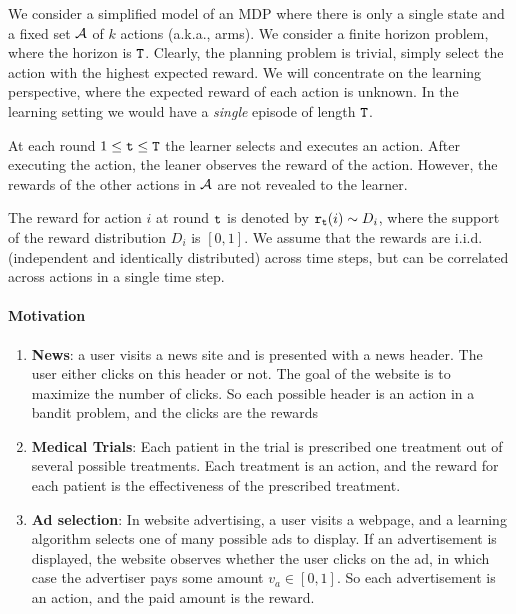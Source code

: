 


We consider a simplified model of an MDP where there is only a
single state and a fixed set $\mathcal{A}$ of $k$ actions (a.k.a., arms). We consider a finite horizon problem, where the horizon is ${\tt T}$.
Clearly, the planning problem is trivial, simply select the action
with the highest expected reward. We will concentrate on the
learning perspective, where the expected reward of each action is
unknown. In the learning setting we would have a \emph{single} episode of length ${\tt T}$.

At each round $1\leq {\tt t}\leq {\tt T}$ the learner selects and executes an action. After executing the action, the leaner observes the reward of the action. However, the rewards of the other actions in $\mathcal{A}$ are not revealed to the learner.

The reward for action $i$ at round ${\tt t}$ is denoted by ${\tt r}_{{\tt t}}(i)\sim D_{i}$, where the support of the reward distribution $D_{i}$ is $[0,1]$. We assume that the rewards are i.i.d. (independent and identically distributed) across time steps, but can be correlated across actions in a single time step.

\paragraph{Motivation}
\begin{enumerate}
\item \textbf{News}: a user visits a news site and is presented with a news header. The user either clicks on this header or not. The goal of
the website is to maximize the number of clicks. So each possible
header is an action in a bandit problem, and the clicks are the
rewards
\item \textbf{Medical Trials}: Each patient in the trial is prescribed one treatment out of several possible treatments. Each treatment is an
action, and the reward for each patient is the effectiveness of the
prescribed treatment.
\item \textbf{Ad selection}: In website advertising, a user visits a webpage, and a learning algorithm selects one of many possible ads to
display. If an advertisement is displayed, the website observes
whether the user clicks on the ad, in which case the advertiser pays
some amount $v_{a} \in[0, 1]$. So each advertisement is an action,
and the paid amount is the reward.
\end{enumerate}

